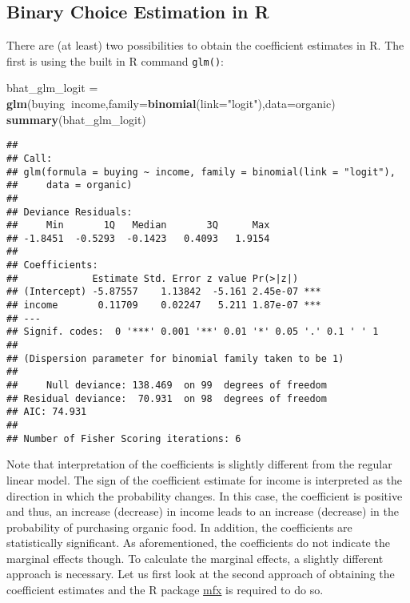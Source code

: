 \documentclass[
]{article}
\newenvironment{Shaded}{\begin{snugshade}}{\end{snugshade}}
\newcommand{\DataTypeTok}[1]{\textcolor[rgb]{0.13,0.29,0.53}{#1}}
\newcommand{\KeywordTok}[1]{\textcolor[rgb]{0.13,0.29,0.53}{\textbf{#1}}}
\newcommand{\NormalTok}[1]{#1}
\newcommand{\OperatorTok}[1]{\textcolor[rgb]{0.81,0.36,0.00}{\textbf{#1}}}
\newcommand{\StringTok}[1]{\textcolor[rgb]{0.31,0.60,0.02}{#1}}
\begin{document}
\hypertarget{binary-choice-estimation-in-r}{%
\subsection{Binary Choice Estimation in R}\label{binary-choice-estimation-in-r}}

There are (at least) two possibilities to obtain the coefficient estimates in R. The first is using the built in R command \texttt{glm()}:

\begin{Shaded}
\begin{Highlighting}[]
\NormalTok{bhat_glm_logit =}\StringTok{ }\KeywordTok{glm}\NormalTok{(buying}\OperatorTok{~}\NormalTok{income,}\DataTypeTok{family=}\KeywordTok{binomial}\NormalTok{(}\DataTypeTok{link=}\StringTok{"logit"}\NormalTok{),}\DataTypeTok{data=}\NormalTok{organic)}
\KeywordTok{summary}\NormalTok{(bhat_glm_logit)}
\end{Highlighting}
\end{Shaded}

\begin{verbatim}
## 
## Call:
## glm(formula = buying ~ income, family = binomial(link = "logit"), 
##     data = organic)
## 
## Deviance Residuals: 
##     Min       1Q   Median       3Q      Max  
## -1.8451  -0.5293  -0.1423   0.4093   1.9154  
## 
## Coefficients:
##             Estimate Std. Error z value Pr(>|z|)    
## (Intercept) -5.87557    1.13842  -5.161 2.45e-07 ***
## income       0.11709    0.02247   5.211 1.87e-07 ***
## ---
## Signif. codes:  0 '***' 0.001 '**' 0.01 '*' 0.05 '.' 0.1 ' ' 1
## 
## (Dispersion parameter for binomial family taken to be 1)
## 
##     Null deviance: 138.469  on 99  degrees of freedom
## Residual deviance:  70.931  on 98  degrees of freedom
## AIC: 74.931
## 
## Number of Fisher Scoring iterations: 6
\end{verbatim}

Note that interpretation of the coefficients is slightly different from the regular linear model. The sign of the coefficient estimate for income is interpreted as the direction in which the probability changes. In this case, the coefficient is positive and thus, an increase (decrease) in income leads to an increase (decrease) in the probability of purchasing organic food. In addition, the coefficients are statistically significant. As aforementioned, the coefficients do not indicate the marginal effects though. To calculate the marginal effects, a slightly different approach is necessary. Let us first look at the second approach of obtaining the coefficient estimates and the R package \href{https://cran.r-project.org/web/packages/mfx/index.html}{mfx} is required to do so.
\end{document}
